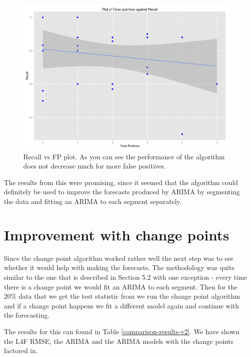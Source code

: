 \documentclass[minf,twoside,singlespacing,parskip,frontabs,notimes,12pt]{infthesis} %
\begin{document}
\begin{figure}[h!]
\begin{center}
\includegraphics[width=\textwidth]{FP_vs_Recall}
\end{center}
\caption{Recall vs FP plot. As you can see the performance of the algorithm does not decrease much for more false positives.}
\label{fprecall}
\end{figure}

The results from this were promising, since it seemed that the algorithm could definitely be used to improve the forecasts produced by ARIMA by segmenting the data and fitting an ARIMA to each segment separately.

\section{Improvement with change points}

Since the change point algorithm worked rather well the next step was to see whether it would help with making the forecasts. The methodology was quite similar to the one that is described in Section 5.2 with one exception - every time there is a change point we would fit an ARIMA to each segment. Then for the 20\% data that we get the test statistic from we run the change point algorithm and if a change point happens we fit a different model again and continue with the forecasting.

The results for this can found in Table \ref{comparison-results-v2}. We have shown the L4F RMSE, the ARIMA and the ARIMA models with the change points factored in. 
\end{document}
